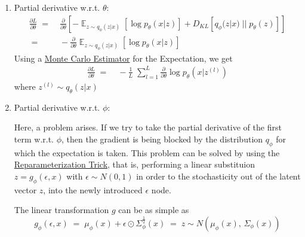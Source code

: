 \documentclass[12pt]{report}
\DeclareMathOperator{\E}{\mathbb{E}}
\begin{document}
\begin{enumerate}
    \item Partial derivative w.r.t. $\theta$:
        \begin{align*}
            \frac{\partial L}{\partial \theta}
            \;=&\; \frac{\partial}{\partial \theta} \left[
                -\E_{z \sim q_{\phi}(z | x)} \left[\log p_{\theta}(x | z) \right]
                + D_{KL}\left[q_{\phi}(z | x) \;||\; p_{\theta}(z) \right]
                 \right] \\[2ex]
            \;=&\; -\frac{\partial}{\partial \theta}
                \E_{z \sim q_{\phi}(z | x)} \left[\log p_{\theta}(x | z) \right]
        \end{align*}
        Using a \href{http://ib.berkeley.edu/labs/slatkin/eriq/classes/guest_
        lect/mc_lecture_notes.pdf}{Monte Carlo Estimator} for the Expectation,
        we get
        \begin{align*}
            \frac{\partial L}{\partial \theta}
            \;=&\; -\frac{1}{L} \;\sum_{l=1}^L \frac{\partial}{\partial \theta}
                \log p_{\theta}(x | z^{(l)})
        \end{align*}
        where $z^{(l)} \sim q_{\theta}(z | x)$

    \item Partial derivative w.r.t. $\phi$:
        \bigskip

        Here, a problem arises. If we try to take the partial derivative of the
        first term w.r.t. $\phi$, then the gradient is being blocked by the
        distribution $q_{\phi}$ for which the expectation is taken. This problem can
        be solved by using the
        \href{https://towardsdatascience.com/reparameterization-trick-126062cfd3c3}
        {Reparameterization Trick}, that is, performing a linear substituion
        $z = g_{\phi}(\epsilon, x)$ with $\epsilon \sim N(0, 1)$ in order to
         the stochasticity out of the latent vector $z$, into the
        newly introduced $\epsilon$ node.

        The linear transformation $g$ can be as simple as
        $$g_{\phi}(\epsilon, x) \;=\; \mu_{\phi}(x) +
                                      \epsilon \odot \Sigma_{\phi}^{\frac{1}{2}}(x)
                                \;=\; z \sim N(\mu_{\phi}(x),\, \Sigma_{\phi}(x))$$
\end{enumerate}
\clearpage
\end{document}

